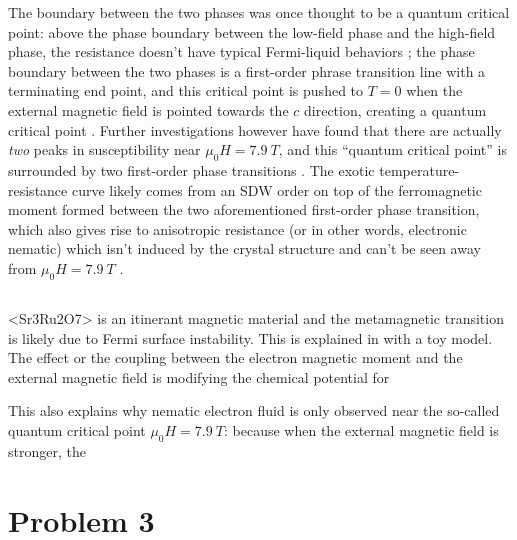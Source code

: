 \documentclass[hyperref, a4paper]{article}
\def\ce#1{<#1>}%
\begin{document}
The boundary between the two phases was once thought to be a quantum critical point:
above the phase boundary between the low-field phase and the high-field phase,
the resistance doesn't have typical Fermi-liquid behaviors
\cite{perry2001metamagnetism};
the phase boundary between the two phases 
is a first-order phrase transition line with a terminating end point, 
and this critical point is pushed to $T = 0$
when the external magnetic field is pointed towards the $c$ direction,
creating a quantum critical point \cite{grigera2003angular}.
Further investigations however have found 
that there are actually \emph{two} peaks in susceptibility 
near $\mu_0 H =\SI{7.9}{T}$, 
and this ``quantum critical point'' is surrounded by two first-order phase transitions
\cite{kitagawa2005metamagnetic,grigera2004disorder}.
The exotic temperature-resistance curve likely comes from 
an SDW order on top of the ferromagnetic moment
formed between the two aforementioned first-order phase transition,
which also gives rise to anisotropic resistance
(or in other words, electronic nematic)
which isn't induced by the crystal structure
and can't be seen away from $\mu_0 H =\SI{7.9}{T}$
\cite{lester2015field,borzi2007formation}.

\subsection{}

\ce{Sr3Ru2O7} is an itinerant magnetic material 
and the metamagnetic transition 
is likely due to Fermi surface instability.
This is explained in \cite{kee2005itinerant} with a toy model.
The effect or the coupling between the electron magnetic moment 
and the external magnetic field 
is modifying the chemical potential for 

This also explains why nematic electron fluid 
is only observed near the so-called quantum critical point 
$\mu_0 H = \SI{7.9}{T}$:
because when the external magnetic field is stronger, 
the 


\section{Problem 3}

\subsection{}
\end{document}
